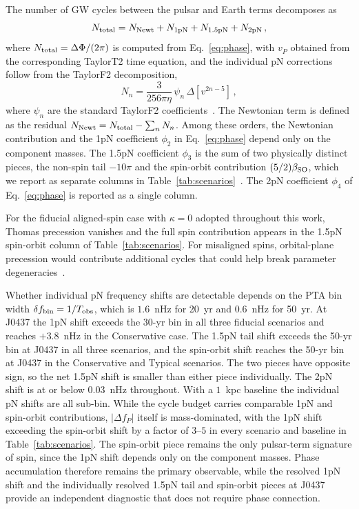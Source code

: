 \documentclass[aps,prx,twocolumn,superscriptaddress,nofootinbib,longbibliography]{revtex4-2}
\begin{document}
The number of GW cycles between the pulsar and Earth terms decomposes as
\begin{equation}\label{eq:cycles}
 N_{\rm total} = N_{\rm Newt} + N_{\rm 1pN} + N_{\rm 1.5pN} + N_{\rm 2pN}\,,
\end{equation}
where $N_{\rm total} = \Delta\Phi/(2\pi)$ is computed from Eq.~\eqref{eq:phase}, with $v_P$ obtained from the corresponding TaylorT2 time equation, and the individual pN corrections follow from the TaylorF2 decomposition,
\begin{equation}\label{eq:Nn_pN}
N_n = \frac{3}{256\pi\eta}\,\psi_n\,\Delta[v^{2n-5}]\,,
\end{equation}
where $\psi_n$ are the standard TaylorF2 coefficients~\cite{Blanchet2006}. The Newtonian term is defined as the residual $N_{\rm Newt}=N_{\rm total}-\sum_n N_n$. Among these orders, the Newtonian contribution and the 1pN coefficient $\phi_2$ in Eq.~\eqref{eq:phase} depend only on the component masses. The 1.5pN coefficient $\phi_3$ is the sum of two physically distinct pieces, the non-spin tail $-10\pi$ and the spin-orbit contribution $(5/2)\beta_{\rm SO}$, which we report as separate columns in Table~\ref{tab:scenarios}~\cite{Mingarelli2012}. The 2pN coefficient $\phi_4$ of Eq.~\eqref{eq:phase} is reported as a single column.

For the fiducial aligned-spin case with $\kappa=0$ adopted throughout this work, Thomas precession vanishes and the full spin contribution appears in the 1.5pN spin-orbit column of Table~\ref{tab:scenarios}. For misaligned spins, orbital-plane precession would contribute additional cycles that could help break parameter degeneracies~\cite{Apostolatos1994,Kidder1995}.

Whether individual pN frequency shifts are detectable depends on the PTA bin width $\delta f_{\rm bin}=1/T_{\rm obs}$, which is $1.6$~nHz for 20~yr and $0.6$~nHz for 50~yr. At J0437 the 1pN shift exceeds the 30-yr bin in all three fiducial scenarios and reaches $+3.8$~nHz in the Conservative case. The 1.5pN tail shift exceeds the 50-yr bin at J0437 in all three scenarios, and the spin-orbit shift reaches the 50-yr bin at J0437 in the Conservative and Typical scenarios. The two pieces have opposite sign, so the net 1.5pN shift is smaller than either piece individually. The 2pN shift is at or below $0.03$~nHz throughout. With a $1$~kpc baseline the individual pN shifts are all sub-bin. While the cycle budget carries comparable 1pN and spin-orbit contributions, $|\Delta f_P|$ itself is mass-dominated, with the 1pN shift exceeding the spin-orbit shift by a factor of $3$--$5$ in every scenario and baseline in Table~\ref{tab:scenarios}. The spin-orbit piece remains the only pulsar-term signature of spin, since the 1pN shift depends only on the component masses. Phase accumulation therefore remains the primary observable, while the resolved 1pN shift and the individually resolved 1.5pN tail and spin-orbit pieces at J0437 provide an independent diagnostic that does not require phase connection.
\end{document}
